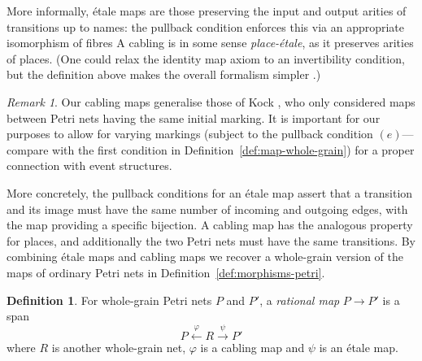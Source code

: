 \documentclass[11pt,a4paper]{article}
\theoremstyle{plain}
\theoremstyle{definition}
\newtheorem{definition}[theorem]{Definition}
\theoremstyle{remark}
\newtheorem{remark}[theorem]{Remark}
\begin{document}
More informally, \'etale maps are those preserving the input and output arities of transitions up to names: the pullback condition enforces this via an appropriate isomorphism of fibres
A cabling is in some sense \emph{place-\'etale}, as it preserves arities of places. (One could relax the identity map axiom to an invertibility condition, but the definition above makes the overall formalism simpler \cite{WGPN}.)


\begin{remark}
  Our cabling maps generalise those of Kock \cite{WGPN}, who only considered
  maps between Petri nets having the same initial marking. It is important for
  our purposes to allow for varying markings (subject to the pullback condition
  $(e)$---compare with the first condition in
  Definition~\ref{def:map-whole-grain})  for a proper
  connection with event structures.
\end{remark}


More concretely, the pullback conditions for an \'etale map assert that a
transition and its image must have the same number of incoming and outgoing
edges, with the map providing a specific bijection. A cabling map has the
analogous property for places, and additionally the two Petri nets must have the
same transitions. By combining \'etale maps and cabling maps we recover a
whole-grain version of the maps of ordinary Petri nets in Definition~\ref{def:morphisms-petri}. 


\begin{definition}
  For whole-grain Petri nets $P$ and $P'$, a \emph{rational map}
  $P \to P'$ is a span
  \[
     P \xleftarrow{\varphi} R \xrightarrow{\psi} P'
  \]
  where $R$ is another whole-grain net, $\varphi$ is a cabling map and $\psi$ is
  an \'etale map.
\end{definition}
\end{document}
